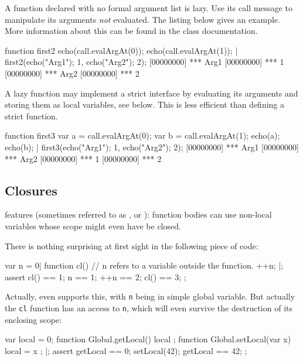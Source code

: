 A function declared with no formal argument list is lazy.  Use its call
message to manipulate its arguments \emph{not} evaluated.  The listing below
gives an example.  More information about this can be found in the
 class documentation.

\begin{urbiscript}
function first2
{
  echo(call.evalArgAt(0));
  echo(call.evalArgAt(1));
}|
first2({echo("Arg1"); 1},
       {echo("Arg2"); 2});
[00000000] *** Arg1
[00000000] *** 1
[00000000] *** Arg2
[00000000] *** 2
\end{urbiscript}

A lazy function may implement a strict interface by evaluating its
arguments and storing them as local variables, see below.  This is
less efficient than defining a strict function.

\begin{urbiscript}
function first3
{
  var a = call.evalArgAt(0);
  var b = call.evalArgAt(1);
  echo(a); echo(b);
}|
first3({echo("Arg1"); 1},
       {echo("Arg2"); 2});
[00000000] *** Arg1
[00000000] *** Arg2
[00000000] *** 1
[00000000] *** 2
\end{urbiscript}

\subsection{Closures}
\label{sec:lang:closure}

\us features  (sometimes referred to as , or ): function bodies can use non-local
variables whose scope might even have be closed.

There is nothing surprising at first sight in the following piece of code:
\begin{urbiscript}
var n = 0|
function cl()
{
  // n refers to a variable outside the function.
  ++n;
}|;
assert
{
  cl() == 1;
     n == 1;
   ++n == 2;
  cl() == 3;
};
\end{urbiscript}

\noindent
Actually, even \langC supports this, with \lstinline|n| being in simple global
variable.  But actually the \lstinline|cl| function has  an
access to \lstinline|n|, which will even survive the destruction of its
enclosing scope:

\begin{urbiscript}
{
  var local = 0;
  function Global.getLocal() { local };
  function Global.setLocal(var x) { local = x };
}|;
assert
{
  getLocal == 0;
  setLocal(42);
  getLocal == 42;
};
\end{urbiscript}

